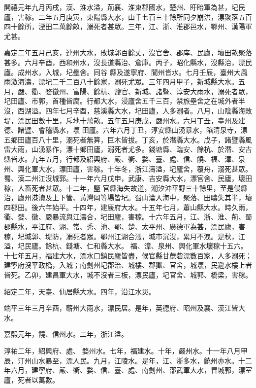 \begin{pinyinscope}
 開禧元年九月丙戌，漢、淮水溢，荊襄、淮東郡國水，楚州、盱眙軍為甚，圮民廬，害稼。二年五月庚寅，東陽縣大水，山千七百三十餘所同夕崩洪，漂聚落五百四十餘所，湮田二萬餘畝，溺死者甚眾。三年，江、浙、淮郡邑水，鄂州、漢陽軍尤甚。



 嘉定二年五月己亥，連州大水，敗城郭百餘丈，沒官舍、郡庠、民廬，壞田畝聚落甚多。六月辛酉，西和州水，沒長道縣治、倉庫。丙子，昭化縣水，沒縣治，漂民廬。成州水，入城，圮壘舍。同谷
 縣及遂寧府、閬州皆水。七月壬辰，臺州大風雨激海濤，漂圮二千二百八十餘家，溺死尤眾。三年四月甲子，新城縣大水。五月，嚴、衢、婺徽州、富陽、餘杭、鹽官、新城、諸暨、淳安大雨水，溺死者眾，圮田廬、市郭，首種皆腐。行都大水，浸廬舍五千三百，禁旅壘舍之在城外者半沒，西湖溢。四年七月辛酉，慈溪縣大水，圮田廬，人多溺者。八月，山陰縣海敗堤，漂民田數十里，斥地十萬畝。五年五月庚戌，嚴州水。六月丁丑，臺州及建德、諸暨、會稽縣水，壞
 田廬。六年六月丁丑，淳安縣山湧暴水，陷清泉寺，漂五鄉田廬百八十里，溺死者無算，巨木皆拔。丁亥，於潛縣大水。戊子，諸暨縣風雷大雨，山湧暴作，漂十鄉田廬，溺死者尤多。錢塘縣、臨安、餘杭、於潛、安吉縣皆水。九年五月，行都及紹興府、嚴、衢、婺、臺、處、信、饒、福、漳、泉州、興化軍大水，漂田廬，害稼。十年冬，浙江濤溢，圮廬舍，覆舟，溺死甚眾。蜀、漢二州江沒城郭。十一年六月戊申，武康、吉安縣大水，漂官舍、民廬，壞田稼，人畜死者甚眾。十二年，鹽
 官縣海失故道，潮汐沖平野三十餘里，至是侵縣治，廬州港瀆及上下管、黃灣岡等場皆圮。蜀山淪入海中，聚落、田疇失其半，壞四郡田。後六年始平。十四年，建康府大水。十五年七月，蕭山縣大水。時久雨，衢、婺、徽、嚴暴流與江濤合，圮田廬，害稼。十六年五月，江、浙、淮、荊、蜀郡縣水，平江府、湖、常、秀、池、鄂、楚、太平州、廣德軍為甚，漂民廬，害稼，圮城郭、堤防，溺死者眾。鄂州江湖合漲，城市沉沒，累月不洩。是秋，江溢，圮民廬。餘杭、錢塘、仁和縣大水。
 福、漳、泉州、興化軍水壞稼十五六。十七年五月，福建大水，漂水口鎮民廬皆盡，候官縣甘蔗砦漂數百家，人多溺死；建寧府沒平政橋，入城；南劍州圮郡治、城樓、郡獄、官舍，城壞，民避水樓上者皆死。乙卯，建昌軍大水，城不沒者三板，漂民廬，圮官舍、城郭、橋梁，害稼。



 紹定二年，天臺、仙居縣大水。四年，沿江水災。



 端平三年三月辛酉，蘄州大雨水，漂民居。是年，英德府、昭州及襄、漢江皆大水。



 嘉熙元年，饒、信州水。二年，浙江溢。



 淳祐二年，紹興府、處、
 婺州水。七年，福建水。十年，嚴州水。十一年八月甲辰，汀州山水暴至，漂人民。九月，江陵水。是年，江、浙多水，饒州亦水。十二年六月，建寧府、嚴、衢、婺、信、臺、處、南劍州、邵武軍大水，冒城郭，漂室廬，死者以萬數。




\end{pinyinscope}
